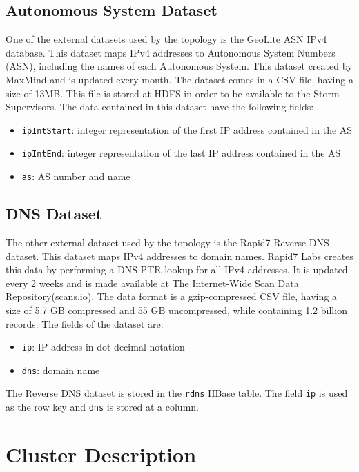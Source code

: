 \subsection{Autonomous System Dataset}

One of the external datasets used by the topology is the GeoLite ASN IPv4 database. This dataset maps IPv4 addresses to Autonomous System Numbers (ASN), including the names of each Autonomous System. This dataset created by MaxMind and is updated every month. The dataset comes in a CSV file, having a size  of 13MB. This file is stored at HDFS in order to be available to the Storm Supervisors. The data contained in this dataset have the following fields:
\begin{itemize}
\item \texttt{ipIntStart}: integer representation of the first IP address contained in the AS
\item \texttt{ipIntEnd}: integer representation of the last IP address contained in the AS
\item \texttt{as}: AS number and name
\end{itemize}

\subsection{DNS Dataset}

The other external dataset used by the topology is the Rapid7 Reverse DNS dataset. This dataset maps IPv4 addresses to domain names. Rapid7 Labs creates this data by performing a DNS PTR lookup for all IPv4 addresses. It is updated every 2 weeks and is made available at The Internet-Wide Scan Data Repository(scans.io). The data format is a gzip-compressed CSV file, having a size of 5.7 GB compressed and 55 GB uncompressed, while containing 1.2 billion records. The fields of the dataset are:
\begin{itemize}
\item \texttt{ip}: IP address in dot-decimal notation
\item \texttt{dns}: domain name
\end{itemize}

The Reverse DNS dataset is stored in the \texttt{rdns} HBase table. The field \texttt{ip} is used as the row key and \texttt{dns} is stored at a column.


\section{Cluster Description}


